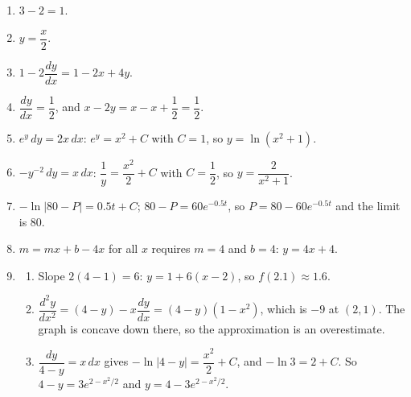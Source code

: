 \documentclass[11pt]{article}
\begin{document}
\newpage
\begin{solbox}
\begin{enumerate}[leftmargin=*,itemsep=4pt]
  \item $3-2=1$.
  \item $y=\dfrac x2$.
  \item $1-2\dfrac{dy}{dx}=1-2x+4y$.
  \item $\dfrac{dy}{dx}=\dfrac12$, and $x-2y=x-x+\dfrac12=\dfrac12$.
  \item $e^{y}\,dy=2x\,dx$: $e^{y}=x^2+C$ with $C=1$, so $y=\ln\!\left(x^2+1\right)$.
  \item $-y^{-2}\,dy=x\,dx$: $\dfrac1y=\dfrac{x^2}{2}+C$ with $C=\dfrac12$, so $y=\dfrac{2}{x^2+1}$.
  \item $-\ln|80-P|=0.5t+C$; $80-P=60e^{-0.5t}$, so $P=80-60e^{-0.5t}$ and the limit is 80.
  \item $m=mx+b-4x$ for all $x$ requires $m=4$ and $b=4$: $y=4x+4$.
  \item \begin{enumerate}[label=(\alph*),leftmargin=*,itemsep=3pt]
    \item Slope $2(4-1)=6$: $y=1+6(x-2)$, so $f(2.1)\approx1.6$.
    \item $\dfrac{d^2y}{dx^2}=(4-y)-x\dfrac{dy}{dx}=(4-y)\left(1-x^2\right)$, which is $-9$ at $(2,1)$. The graph is concave down there, so the approximation is an overestimate.
    \item $\dfrac{dy}{4-y}=x\,dx$ gives $-\ln|4-y|=\dfrac{x^2}{2}+C$, and $-\ln3=2+C$. So $4-y=3e^{2-x^2/2}$ and $y=4-3e^{2-x^2/2}$.
  \end{enumerate}
\end{enumerate}
\end{solbox}
\end{document}
